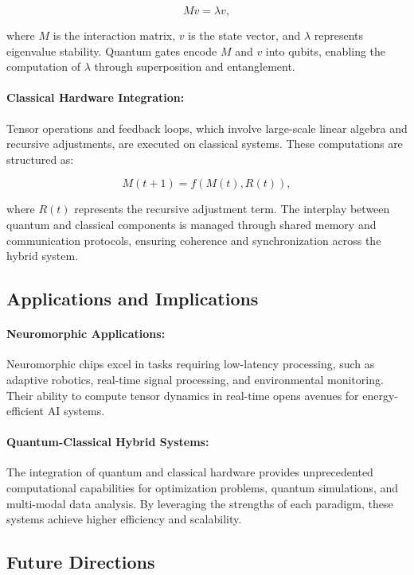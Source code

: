 \documentclass{article}
\theoremstyle{plain}
\begin{document}
\begin{equation}
Mv = \lambda v,
\end{equation}

where $M$ is the interaction matrix, $v$ is the state vector, and $\lambda$ represents eigenvalue stability. Quantum gates encode $M$ and $v$ into qubits, enabling the computation of $\lambda$ through superposition and entanglement.

\paragraph{Classical Hardware Integration:}
Tensor operations and feedback loops, which involve large-scale linear algebra and recursive adjustments, are executed on classical systems. These computations are structured as:

\begin{equation}
M(t+1) = f(M(t), R(t)),
\end{equation}

where $R(t)$ represents the recursive adjustment term. The interplay between quantum and classical components is managed through shared memory and communication protocols, ensuring coherence and synchronization across the hybrid system.

\subsection{Applications and Implications}

\paragraph{Neuromorphic Applications:}
Neuromorphic chips excel in tasks requiring low-latency processing, such as adaptive robotics, real-time signal processing, and environmental monitoring. Their ability to compute tensor dynamics in real-time opens avenues for energy-efficient AI systems.

\paragraph{Quantum-Classical Hybrid Systems:}
The integration of quantum and classical hardware provides unprecedented computational capabilities for optimization problems, quantum simulations, and multi-modal data analysis. By leveraging the strengths of each paradigm, these systems achieve higher efficiency and scalability.

\subsection{Future Directions}
\end{document}
